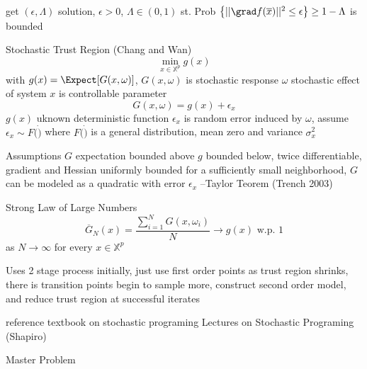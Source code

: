 get $(\epsilon, \Lambda)$ solution, $\epsilon > 0$, $\Lambda \in (0,1)$
st.
Prob $\left\{ || \grad f(\overline{x}) ||^2 \le \epsilon \right\} \ge 1-\Lambda$
is bounded




Stochastic Trust Region	(Chang and Wan) \cite{chang_2009}
\begin{equation}
\min_{x \in \mathbb{X}^p} g(x)
\end{equation}
with $g(x) = \Expect [ G(x,\omega) ]$, 
$G(x, \omega)$ is stochastic response
$\omega$ stochastic effect of system
$x$ is controllable parameter
\begin{equation}
G(x, \omega) = g(x) + \epsilon_x
\end{equation}
$g(x)$ uknown deterministic function
$\epsilon_x$ is random error induced by $\omega$, assume $\epsilon_x \sim F( \dot )$ where 
$F( \dot )$ is a general distribution, mean zero and variance $\sigma_x^2$

Assumptions
$G$ expectation bounded above
$g$ bounded below, twice differentiable, gradient and Hessian uniformly bounded
for a sufficiently small neighborhood, $G$ can be modeled as a quadratic with error $\epsilon_x$ 
--Taylor Teorem (Trench 2003)

Strong Law of Large Numbers
\begin{equation}
\overline{G}_N (x) = \frac{ \sum_{i=1}^N G(x,\omega_i) }{N} \rightarrow g(x) \mbox{    w.p. 1}
\end{equation}
as $N \rightarrow \infty$ for every $x \in \mathbb{X}^p$

Uses 2 stage process
initially, just use first order points
as trust region shrinks, there is transition points
begin to sample more, construct second order model, and reduce trust region at successful iterates



reference textbook on stochastic programing
Lectures on Stochastic Programing (Shapiro) \cite{shapiro_2009}


Master Problem


